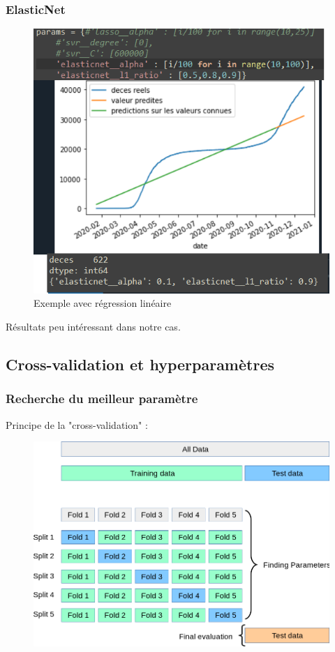 \documentclass{beamer}
\begin{document}
\begin{frame}
	\frametitle{ElasticNet}
	\begin{figure}[b]
		\includegraphics[scale=0.3]{EN}
		\centering
		\caption{Exemple avec régression linéaire}
	\end{figure}
	Résultats peu intéressant dans notre cas.
\end{frame}

\subsection{Cross-validation et hyperparamètres}
\begin{frame}
	\frametitle{Recherche du meilleur paramètre}
	Principe de la  "cross-validation" :
	\begin{figure}[b]
		\centering
		\includegraphics[scale=0.27]{gscv}
	\end{figure}
\end{frame}
\end{document}
